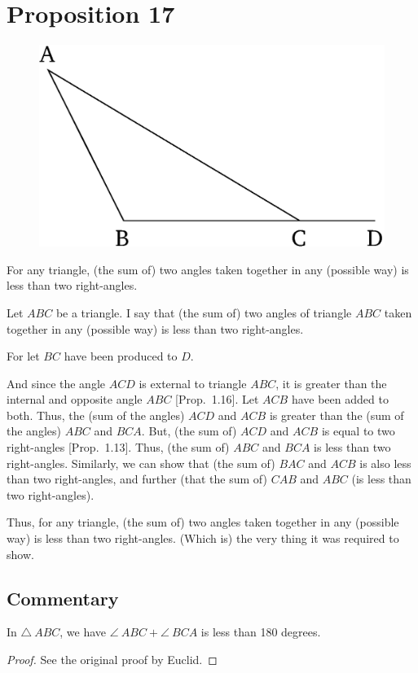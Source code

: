 \chapter*{Proposition 17}
\label{prop:17}


\begin{figure}[ht]
    \begin{center}
    \includegraphics[width=0.5\linewidth]{figures/fig17e.eps}
    \label{fig:prop_17}
    \end{center}
\end{figure}

For any triangle,  (the sum of) two angles taken together in any (possible way) is less than two right-angles.

Let $ABC$ be a triangle. I say that (the sum of) two angles of triangle $ABC$
taken together in any (possible way) is less than two right-angles.

For let $BC$ have been produced to $D$.

And since the angle $ACD$ is external to triangle $ABC$, it is greater than the
internal and opposite angle $ABC$ [Prop.~1.16]. Let $ACB$ have been added to both. Thus, the
(sum of the angles) $ACD$ and $ACB$ is greater than the  (sum of the angles) $ABC$ and
$BCA$. But, (the sum of) $ACD$ and $ACB$ is equal to two right-angles [Prop.~1.13].
Thus, (the sum of) $ABC$ and $BCA$ is less than two right-angles. Similarly,
we can show that (the sum of) $BAC$ and $ACB$ is also less than two right-angles,
and further (that the sum of) $CAB$ and $ABC$ (is less than two right-angles).

Thus, for any triangle,  (the sum of) two angles taken together in any (possible way) is less than two right-angles. (Which is) the very thing
it was required to show.


\section*{Commentary}

\begin{proposition}\label{proposition_17}\leanok
    In $\triangle~ABC$, we have $\angle~ABC + \angle~BCA$ is less than 180 degrees. 
\end{proposition}
\begin{proof}
    \leanok
    See the original proof by Euclid.
\end{proof}

